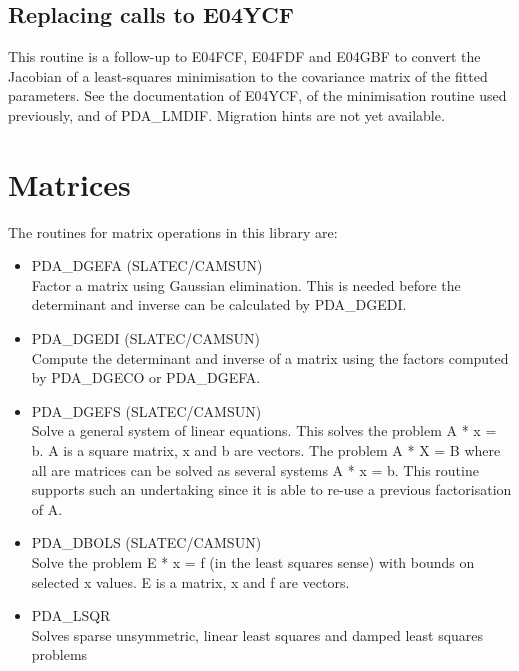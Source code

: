 \documentclass[11pt,twoside]{article}
\newcommand{\htmlref}[2]{#1}
\newcommand{\xlabel}[1]{}
\begin{document}

\subsection{\xlabel{replacing_calls_to_e04ycf}Replacing calls to E04YCF}

   This routine is a follow-up to E04FCF, E04FDF and E04GBF to convert
   the Jacobian of a least-squares minimisation to the covariance matrix
   of the fitted parameters.
   See the documentation of E04YCF, of the minimisation routine used
   previously, and of
\htmlref{PDA\_LMDIF.}{PDA\_LMDIF}
   Migration hints are not yet available.


\section{\xlabel{matrices}Matrices}

   The routines for matrix operations in this library are:

\begin{itemize}

\item \htmlref{PDA\_DGEFA}{PDA\_DGEFA} (SLATEC/CAMSUN)\ \\
   Factor a matrix using Gaussian elimination. This is needed before
   the determinant and inverse can be calculated by PDA\_DGEDI.
\item \htmlref{PDA\_DGEDI}{PDA\_DGEDI} (SLATEC/CAMSUN)\ \\
   Compute the determinant and inverse of a matrix using the factors
   computed by PDA\_\-DGECO or PDA\_DGEFA.
\item \htmlref{PDA\_DGEFS}{PDA\_DGEFS} (SLATEC/CAMSUN)\ \\
   Solve a general system of linear equations. This solves the
   problem A * x = b. A is a square matrix, x and b are vectors. The
   problem A * X = B where all are matrices can be solved as several
   systems A * x = b. This routine supports such an undertaking since
   it is able to re-use a previous factorisation of A.
\item \htmlref{PDA\_DBOLS}{PDA\_DBOLS} (SLATEC/CAMSUN)\ \\
   Solve the problem E * x = f (in the least squares sense) with
   bounds on selected x values. E is a matrix, x and f are vectors.
\item \htmlref{PDA\_LSQR}{PDA\_LSQR} \\
   Solves sparse unsymmetric, linear least squares and damped least
   squares problems

\end{itemize}
\end{document}
